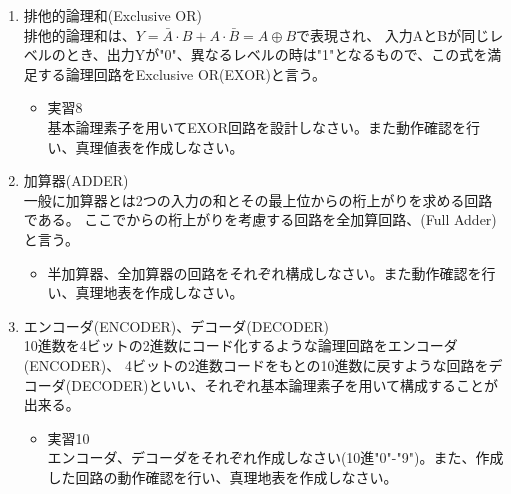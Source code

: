 \documentclass[dvipdfmx]{jsarticle}
\begin{document}
\begin{enumerate}
						\item 排他的論理和(Exclusive OR) \\
							排他的論理和は、$Y = \bar{A} \cdot B + A \cdot \bar{B} = A \oplus B$で表現され、
							入力AとBが同じレベルのとき、出力Yが"0"、異なるレベルの時は"1"となるもので、この式を満足する論理回路をExclusive OR(EXOR)と言う。
							\begin{itemize}
								\item 実習8\\
									基本論理素子を用いてEXOR回路を設計しなさい。また動作確認を行い、真理値表を作成しなさい。
							\end{itemize}
						\item 加算器(ADDER) \\
							一般に加算器とは2つの入力の和とその最上位からの桁上がりを求める回路である。
							ここでからの桁上がりを考慮する回路を全加算回路、(Full Adder)と言う。
							\begin{itemize}
								\item 半加算器、全加算器の回路をそれぞれ構成しなさい。また動作確認を行い、真理地表を作成しなさい。
							\end{itemize}
						\item エンコーダ(ENCODER)、デコーダ(DECODER) \\
							10進数を4ビットの2進数にコード化するような論理回路をエンコーダ(ENCODER)、
							4ビットの2進数コードをもとの10進数に戻すような回路をデコーダ(DECODER)といい、それぞれ基本論理素子を用いて構成することが出来る。
							\begin{itemize}
								\item 実習10 \\
									エンコーダ、デコーダをそれぞれ作成しなさい(10進"0"-"9")。また、作成した回路の動作確認を行い、真理地表を作成しなさい。
							\end{itemize}
					\end{enumerate}
\end{document}
